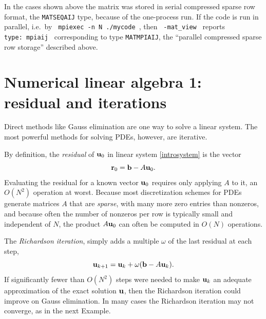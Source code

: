 In the cases shown above the matrix was stored in serial compressed sparse row format, the \texttt{MATSEQAIJ} type, because of the one-process run.  If the code is run in parallel, i.e.~by \texttt{ mpiexec -n N ./mycode }, then \texttt{ -mat\_view }  reports \texttt{ type:~mpiaij } corresponding to \pMat type \texttt{MATMPIAIJ}, the ``parallel compressed sparse row storage'' described above.


\section{Numerical linear algebra 1: residual and iterations}

Direct methods like Gauss elimination \citep{TrefethenBau1997} are one way to solve a linear system.  The most powerful methods for solving PDEs, however, are iterative.

By definition, the \emph{residual} of $\mathbf{u}_0$ in linear system \eqref{introsystem} is the vector
\begin{equation}
\mathbf{r}_0 = \mathbf{b} - A \mathbf{u}_0. \label{residualdefn}
\end{equation}
Evaluating the residual for a known vector $\mathbf{u}_0$ requires only applying $A$ to it, an $O(N^2)$ operation at worst.  Because most discretization schemes for PDEs generate matrices $A$ that are \emph{sparse}, with many more zero entries than nonzeros, and because often the number of nonzeros per row is typically small and independent of $N$, the product $A\mathbf{u}_0$ can often be computed in $O(N)$ operations.

The \emph{Richardson iteration}, simply adds a multiple $\omega$ of the last residual at each step,
\begin{equation}
\mathbf{u}_{k+1} = \mathbf{u}_k + \omega (\mathbf{b} - A \mathbf{u}_k).  \label{introrichardson}
\end{equation}
If significantly fewer than $O(N^2)$ steps were needed to make $\mathbf{u}_k$ an adequate approximation of the exact solution $\mathbf{u}$, then the Richardson iteration could improve on Gauss elimination.  In many cases the Richardson iteration may not converge, as in the next Example.

